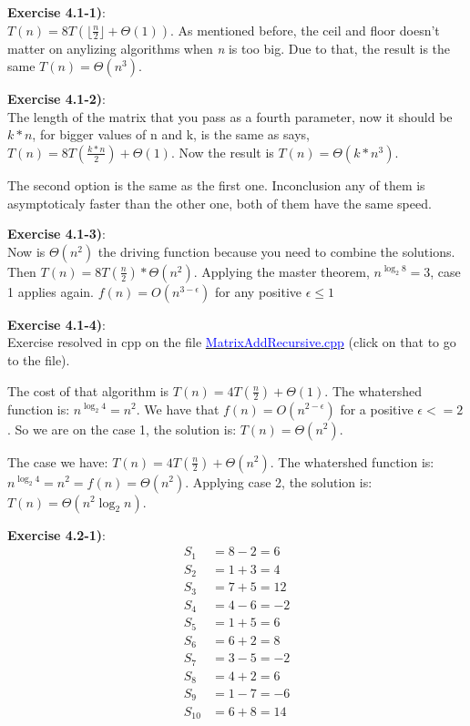 \documentclass{article}
\newcounter{exercise}[section]   %
\begin{document}
\textbf{Exercise 4.1-1)}:\\
\(T(n) = 8T(\lfloor\frac{n}{2}\rfloor + \Theta(1))\). As mentioned before, the ceil and floor
doesn't matter on anylizing algorithms when \textit{n} is too big. Due to that, the result
is the same \(T(n) = \Theta(n^3)\).

\textbf{Exercise 4.1-2)}:\\
The length of the matrix that you pass as a fourth parameter, now it should be \(k * n\), for
bigger values of n and k, is the same as says, \(T(n) = 8T(\frac{k * n}{2}) + \Theta(1)\).
Now the result is \(T(n) = \Theta(k * n^3)\). 

The second option is the same as the first one. Inconclusion any of them is asymptoticaly
faster than the other one, both of them have the same speed.

\textbf{Exercise 4.1-3)}:\\
Now is \(\Theta(n^2)\) the driving function because you need to combine the solutions.
Then \(T(n) = 8T(\frac{n}{2}) * \Theta(n^2)\). Applying the master theorem, \(n^{\log_2 8}
= 3\), case 1 applies again. \(f(n) = O(n^{3 - \epsilon})\) for any positive \(\epsilon \leq
1\)

\textbf{Exercise 4.1-4)}:\\
Exercise resolved in cpp on the file \href{https://github.com/Graburr/Algorithms_CLRS_4ed_solutions/blob/main/chapter1/Divide_%26_Conquer/MatrixAddRecursive.cpp}
{\textcolor{blue}{MatrixAddRecursive.cpp}} (click on that to go to the file).

The cost of that algorithm is \(T(n) = 4T(\frac{n}{2}) + \Theta(1)\). The whatershed function
is: \(n^{\log_2 4} = n^2\). We have that \(f(n) = O(n^{2 - \epsilon})\) for a positive
\(\epsilon <= 2\). So we are on the case 1, the solution is: \(T(n) = \Theta(n^2)\).

The case we have: \(T(n) = 4T(\frac{n}{2}) + \Theta(n^2)\). The whatershed function is: 
\(n^{\log_2 4} = n^2 = f(n) = \Theta(n^2)\). Applying case 2, the solution is: \(T(n) = 
\Theta(n^2 \log_2 n)\).

\textbf{Exercise 4.2-1)}:
\begin{align*}
    S_1 &= 8 - 2 = 6 \\ S_2 &= 1 + 3 = 4 \\ S_3 &= 7 + 5 = 12 \\ S_4 &= 4 - 6 = -2 \\ 
    S_5 &= 1 + 5 = 6 \\ S_6 &= 6 + 2 = 8 \\ S_7 &= 3 - 5 = -2 \\ S_8 &= 4 + 2 = 6 \\
    S_9 &= 1 - 7 = -6 \\ S_{10} &= 6 + 8 = 14   
\end{align*}
\end{document}
